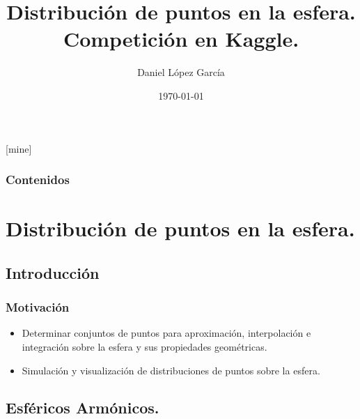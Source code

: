 \documentclass{beamer}
\title[Distribución de puntos en la esfera.Competición en Kaggle.]{Distribución de puntos en la esfera.\\ Competición en Kaggle.} %
\author{Daniel López García} %
\institute[UGR] %
{
  Universidad de Granada \\ %
}
\date{\today} %
\theoremstyle{plain}
\theoremstyle{definition}
\theoremstyle{plain}
\theoremstyle{definition}
\theoremstyle{remark}
\theoremstyle{definition}
\theoremstyle{lem}
\theoremstyle{cor}
\begin{document}
\theoremstyle{definition}
[mine]

\frame{\titlepage}

\begin{frame}
  \frametitle{Contenidos} %
  \tableofcontents
\end{frame}



\section{Distribución de puntos en la esfera.} %
\subsection{Introducción}
\begin{frame}
	\frametitle{Motivación}
	\begin{itemize}
		\item Determinar conjuntos de puntos
		para aproximación, interpolación e integración sobre la esfera y sus propiedades geométricas.
		\item Simulación y visualización de distribuciones de puntos sobre la esfera.
	\end{itemize}
	
\end{frame}
\subsection{Esféricos Armónicos.}
\end{document}
